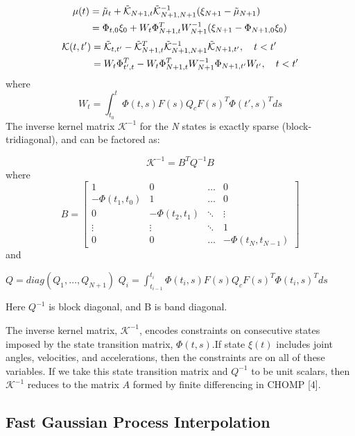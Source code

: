 \documentclass{IEEEtran}
\begin{document}
\begin{align}
\mu(t)&=\tilde{\mu}_t+\tilde{\mathcal{K}}_{{N+1},t}{\tilde{\mathcal{K}}_{{N+1},{N+1}}}^{-1}(\xi_{N+1}-\tilde{\mu}_{N+1})\\
&=\Phi_{t,0}\xi_0+W_t\Phi^T_{{N+1},t}W^{-1}_{N+1}(\xi_{N+1}-\Phi_{{N+1},0}\xi_0)\notag
\end{align}
\begin{align}
\mathcal{K}(t,t')&={\tilde{\mathcal{K}}}_{t,t'}-{\tilde{\mathcal{K}}}^{T}_{{N+1},t}{\tilde{\mathcal{K}}}^{-1}_{{N+1},{N+1}}\tilde{\mathcal{K}}_{{N+1},t'},\quad t<t'\\
&=W_t\Phi^T_{t',t}-W_t\Phi^{T}_{{N+1},t}W^{-1}_{N+1}\Phi_{{N+1},t'}W_{t'},\quad t<t'\notag
\end{align}
where
\begin{equation}
W_t=\int_{t_0}^{t}\Phi(t,s)F(s)Q_c{F(s)}^T{\Phi(t',s)}^Tds
\end{equation}
The inverse kernel matrix ${\mathcal{K}}^{-1}$
for the \textit{N} states is exactly
sparse (block-tridiagonal), and can be factored as:

\begin{equation}
{\mathcal{K}}^{-1}=B^TQ^{-1}B
\end{equation}
where
\[
B=\begin{bmatrix}
1&0 &\dots &0\\
{-\Phi({t_1},{t_0})}&1 &\dots  &0\\
0&{-\Phi({t_2},{t_1})}&\ddots&\vdots\\
\vdots&\vdots&\ddots&1\\
0&0 &\dots &{-\Phi({t_N},{t_{N-1}})}\tag{14}
\end{bmatrix}
\]
and
\begin{center}
$Q=diag(Q_1,\dots,Q_{N+1})$
$Q_i=\int_{t_{i-1}}^{t_i}\Phi(t_i,s)F(s)Q_c{F(s)}^T{\Phi(t_i,s)}^Tds$
\end{center}
Here $Q^{-1}$
is block diagonal, and B is band diagonal.

The inverse kernel matrix, ${\mathcal{K}}^{-1}$, encodes constraints on
consecutive states imposed by the state transition matrix,
$\Phi(t, s)$.If state $\xi(t)$ includes joint angles, velocities, and
accelerations, then the constraints are on all of these variables. If we take this state transition matrix and $Q^{-1}$
to be
unit scalars, then ${\mathcal{K}}^{-1}$
reduces to the matrix $\textit{A}$ formed by
finite differencing in CHOMP [4].

\subsection{Fast Gaussian Process Interpolation}
\end{document}
